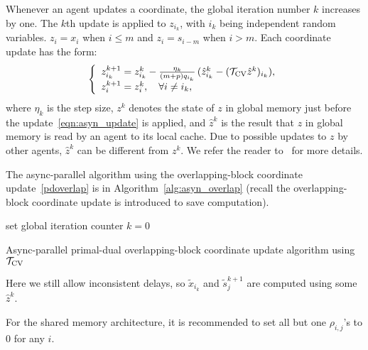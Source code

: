 {{{Whenever an agent updates a coordinate, the global iteration number $k$ increases by one.
The $k$th update is applied to $z_{i_k}$, with $i_k$ being independent random variables. $z_i=x_i$ when $i\leq m$ and $z_i=s_{i-m}$ when $i>m$.  Each coordinate update has
the form:
\begin{equation}
\label{eqn:asyn_update}
\left\{
\begin{array}{l}
z_{i_k}^{k+1} = z_{i_k}^k - \frac{\eta_k}{(m+p)q_{i_k}} \, (\hat{z}^k_{i_k}-(\TVC \hat{z}^k)_{i_k}),\\
z_i^{k+1}=z_i^k,\quad \forall i\neq i_k,
\end{array}
\right.
\end{equation}
where $\eta_k$ is the step size, $z^k$ denotes the state of $z$ in global memory just before the update~\eqref{eqn:asyn_update} is applied, and $\hat{z}^k$ is the result that $z$ in global memory is read by an agent to its local cache. Due to possible updates to $z$ by other agents, $\hat{z}^k$
can be different from $z^k$. We refer the reader to~\cite[Section 1.2]{Peng_2015_AROCK} for more details.
 
The async-parallel algorithm using the overlapping-block coordinate update~\eqref{pdoverlap} is in Algorithm~\ref{alg:asyn_overlap} (recall the overlapping-block coordinate update is introduced to save computation).

\begin{algorithm}[H]\label{alg:asyn_overlap}
{}
 set global iteration
counter $k=0$\; 
 \caption{Async-parallel primal-dual overlapping-block coordinate update algorithm using ${{\mathcal{T}}_{\textnormal{CV}}}$}
\end{algorithm}
Here we still allow inconsistent delays, so $\tilde{x}_{i_k}$ and $\tilde{s}_j^{k+1}$ are computed using some $\hat{z}^k$.
\begin{remark}
For the shared memory architecture, it is recommended to set all but one $\rho_{i,j}$'s to $0$ for any $i$.
\end{remark}

}}}
